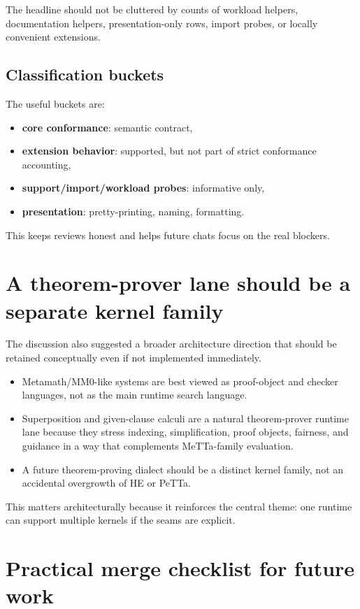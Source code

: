 \documentclass[11pt]{article}
\begin{document}
The headline should not be cluttered by counts of workload helpers, documentation helpers, presentation-only rows, import probes, or locally convenient extensions.

\subsection{Classification buckets}

The useful buckets are:
\begin{itemize}
    \item \textbf{core conformance}: semantic contract,
    \item \textbf{extension behavior}: supported, but not part of strict conformance accounting,
    \item \textbf{support/import/workload probes}: informative only,
    \item \textbf{presentation}: pretty-printing, naming, formatting.
\end{itemize}

This keeps reviews honest and helps future chats focus on the real blockers.

\section{A theorem-prover lane should be a separate kernel family}

The discussion also suggested a broader architecture direction that should be retained conceptually even if not implemented immediately.

\begin{itemize}
    \item Metamath/MM0-like systems are best viewed as proof-object and checker languages, not as the main runtime search language.
    \item Superposition and given-clause calculi are a natural theorem-prover runtime lane because they stress indexing, simplification, proof objects, fairness, and guidance in a way that complements MeTTa-family evaluation.
    \item A future theorem-proving dialect should be a distinct kernel family, not an accidental overgrowth of HE or PeTTa.
\end{itemize}

This matters architecturally because it reinforces the central theme: one runtime can support multiple kernels if the seams are explicit.

\section{Practical merge checklist for future work}
\end{document}
